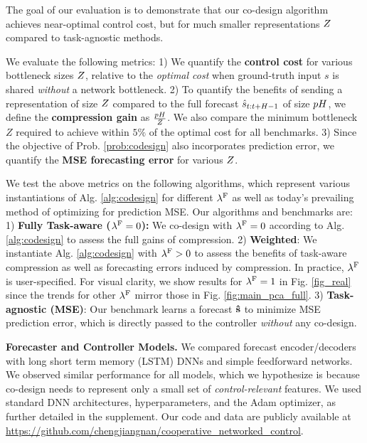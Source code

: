 The goal of our evaluation is to demonstrate that our co-design
algorithm achieves near-optimal control cost, but for much smaller representations $Z$ compared to task-agnostic methods. 

 We evaluate the following metrics: 
1) We quantify the \textbf{control cost} for various bottleneck sizes $Z$, relative to the \textit{optimal cost} when ground-truth input $s$ is shared \textit{without} a network bottleneck.
2) To quantify the benefits of sending a representation of size $Z$ compared to the full forecast $\hat{s}_{t:t+H-1}$ of size $pH$, we define the \textbf{compression gain} as $\frac{pH}{Z}$. We also compare the minimum bottleneck $Z$ required to achieve within $5\%$ of the optimal cost for all benchmarks. 
3) Since the objective of Prob. \ref{prob:codesign} also incorporates prediction error, we quantify the \textbf{MSE forecasting error} for various $Z$.

% 

 We test the above metrics on the following algorithms, which represent various instantiations of Alg. \ref{alg:codesign} for different $\lambda^{\mathrm{F}}$ as well as today's prevailing method of optimizing for prediction MSE. Our algorithms and benchmarks are:
1) \textbf{Fully Task-aware ($\lambda^{\mathrm{F}}=0$):} We co-design with $\lambda^{\mathrm{F}}=0$ according to Alg. \ref{alg:codesign} to assess the full gains of compression.
2) \textbf{Weighted}: We instantiate Alg. \ref{alg:codesign} with $\lambda^{\mathrm{F}} > 0$ to assess the benefits of task-aware compression as well as forecasting errors induced by compression. In practice, $\lambda^{\mathrm{F}}$ is user-specified. For visual clarity, we show results for $\lambda^{\mathrm{F}}=1$ in Fig. \ref{fig_real} since the trends for other $\lambda^{\mathrm{F}}$ mirror those in Fig. \ref{fig:main_pca_full}.
3) \textbf{Task-agnostic (MSE)}: Our benchmark learns a forecast $\bold{\hat{s}}$ to minimize MSE prediction error, which is directly passed to the controller \textit{without} any co-design.

\textbf{Forecaster and Controller Models.} 
We compared forecast encoder/decoders with long short term memory (LSTM) DNNs \cite{LSTM} and simple feedforward networks. We observed similar performance for all models, which we hypothesize is because co-design needs to represent only a small set of \textit{control-relevant} features. We used standard DNN architectures, hyperparameters, and the Adam optimizer, as further detailed in the supplement. 
Our code and data are publicly available at \url{https://github.com/chengjiangnan/cooperative_networked_control}.

